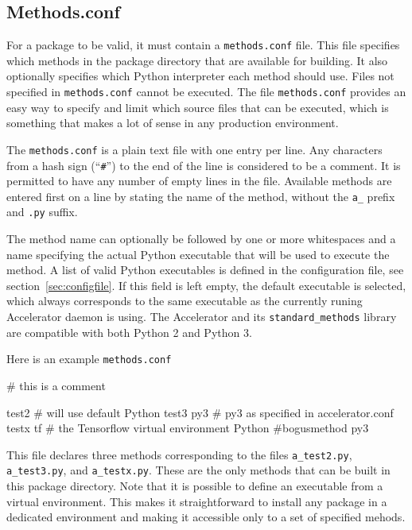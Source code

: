 \subsection{Methods.conf}
\label{sec:methods_conf}
For a package to be valid, it must contain a \texttt{methods.conf}
file.  This file specifies which methods in the package directory that
are available for building.  It also optionally specifies which Python
interpreter each method should use.  Files not specified in
\texttt{methods.conf} cannot be executed.  The file
\texttt{methods.conf} provides an easy way to specify and limit which
source files that can be executed, which is something that makes a lot
of sense in any production environment.

The \texttt{methods.conf} is a plain text file with one entry per
line.  Any characters from a hash sign (``\texttt{\#}'') to the end of
the line is considered to be a comment.  It is permitted to have any
number of empty lines in the file.  Available methods are entered
first on a line by stating the name of the method, without the
\texttt{a\_} prefix and \texttt{.py} suffix.

The method name can optionally be followed by one or more whitespaces
and a name specifying the actual Python executable that will be used
to execute the method.  A list of valid Python executables is defined
in the configuration file, see section~\ref{sec:configfile}.  If this
field is left empty, the default executable is selected, which always
corresponds to the same executable as the currently runing Accelerator
daemon is using.  The Accelerator and its \texttt{standard\_methods}
library are compatible with both Python 2 and Python 3.

Here is an example \texttt{methods.conf}
\begin{shell}
# this is a comment

test2                # will use default Python
test3           py3  # py3 as specified in accelerator.conf
testx           tf   # the Tensorflow virtual environment Python
#bogusmethod    py3
\end{shell}
This file declares three methods corresponding to the files
\texttt{a\_test2.py}, \texttt{a\_test3.py}, and \texttt{a\_testx.py}.
These are the only methods that can be built in this package
directory.  Note that it is possible to define an executable from a
virtual environment.  This makes it straightforward to install any
package in a dedicated environment and making it accessible only to a
set of specified mehods.



